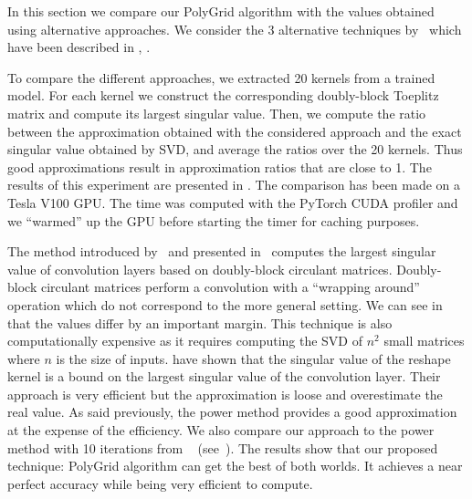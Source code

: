 In this section we compare our PolyGrid algorithm with the values obtained using alternative approaches.
We consider the 3 alternative techniques by~\citet{sedghi2018singular,singla2019bounding,farnia2018generalizable} which have been described in , .

To compare the different approaches, we extracted 20 kernels from a trained model.
For each kernel we construct the corresponding doubly-block Toeplitz matrix and compute its largest singular value.
Then, we compute the ratio between the approximation obtained with the considered approach and the exact singular value obtained by SVD, and average the ratios over the 20 kernels.
Thus good approximations result in approximation ratios that are close to 1.
The results of this experiment are presented in .
The comparison has been made on a Tesla V100 GPU.
The time was computed with the PyTorch CUDA profiler and we ``warmed'' up the GPU before starting the timer for caching purposes. 

The method introduced by~\citet{sedghi2018singular} and presented in~ computes the largest singular value of convolution layers based on doubly-block circulant matrices.
Doubly-block circulant matrices perform a convolution with a ``wrapping around'' operation which do not correspond to the more general setting.
We can see in  that the values differ by an important margin.
This technique is also computationally expensive as it requires computing the SVD of $n^2$ small matrices where $n$ is the size of inputs.
\citet{singla2019bounding} have shown that the singular value of the reshape kernel is a bound on the largest singular value of the convolution layer.
Their approach is very efficient but the approximation is loose and overestimate the real value.
As said previously, the power method provides a good approximation at the expense of the efficiency.
We also compare our approach to the power method with 10 iterations from ~\citet{farnia2018generalizable} (see~).
The results show that our proposed technique: PolyGrid algorithm can get the best of both worlds.
It achieves a near perfect accuracy while being very efficient to compute.

